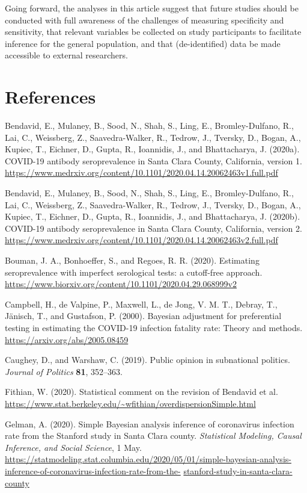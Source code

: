 \documentclass[11pt]{article}
\begin{document}
Going forward, the analyses in this article suggest that future studies should be conducted with full awareness of the challenges of measuring specificity and sensitivity, that relevant variables be collected on study participants to facilitate inference for the general population, and that (de-identified) data be made accessible to external researchers.


\section*{References}

\noindent

\bibitem  Bendavid, E., Mulaney, B., Sood, N., Shah, S., Ling, E., Bromley-Dulfano, R., Lai, C.,  Weissberg, Z., Saavedra-Walker, R., Tedrow, J., Tversky, D., Bogan, A., Kupiec, T., Eichner, D., Gupta, R., Ioannidis, J., and Bhattacharya, J. (2020a).  COVID-19 antibody seroprevalence in Santa Clara County, California, version 1. \url{https://www.medrxiv.org/content/10.1101/2020.04.14.20062463v1.full.pdf}

\bibitem  Bendavid, E., Mulaney, B., Sood, N., Shah, S., Ling, E., Bromley-Dulfano, R., Lai, C.,  Weissberg, Z., Saavedra-Walker, R., Tedrow, J., Tversky, D., Bogan, A., Kupiec, T., Eichner, D., Gupta, R., Ioannidis, J., and Bhattacharya, J. (2020b).  COVID-19 antibody seroprevalence in Santa Clara County, California, version 2. \url{https://www.medrxiv.org/content/10.1101/2020.04.14.20062463v2.full.pdf}

\bibitem Bouman, J. A., Bonhoeffer, S., and Regoes, R. R.  (2020).  Estimating seroprevalence with imperfect serological tests: a cutoff-free approach.  \url{https://www.biorxiv.org/content/10.1101/2020.04.29.068999v2}

\bibitem Campbell, H., de Valpine, P., Maxwell, L., de Jong, V. M. T., Debray, T., Jänisch, T., and Gustafson, P. (2000).  Bayesian adjustment for preferential testing in estimating the COVID-19 infection fatality rate: Theory and methods.  \url{https://arxiv.org/abs/2005.08459}

\bibitem Caughey, D., and Warshaw, C. (2019).  Public opinion in subnational politics.  {\em Journal of Politics} {\bf 81}, 352--363.

\bibitem Fithian, W. (2020).  Statistical comment on the revision of Bendavid et al. \url{https://www.stat.berkeley.edu/~wfithian/overdispersionSimple.html}

\bibitem Gelman, A. (2020).  Simple Bayesian analysis inference of coronavirus infection rate from the Stanford study in Santa Clara county. {\em Statistical Modeling, Causal Inference, and Social Science}, 1 May.  \url{https://statmodeling.stat.columbia.edu/2020/05/01/simple-bayesian-analysis-inference-of-coronavirus-infection-rate-from-the-} \url{stanford-study-in-santa-clara-county}
\end{document}
